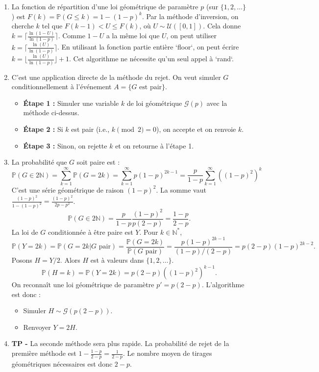 \documentclass[solutions]{exercices}
\begin{document}
\begin{solution}
\begin{enumerate}
  \item La fonction de répartition d'une loi géométrique de paramètre $p$ (sur $\{1, 2, \dots\}$) est $F(k) = \mathbb{P}(G \le k) = 1 - (1-p)^k$. Par la méthode d'inversion, on cherche $k$ tel que $F(k-1) < U \le F(k)$, où $U \sim \mathcal{U}([0,1])$. Cela donne $k = \lceil \frac{\ln(1-U)}{\ln(1-p)} \rceil$. Comme $1-U$ a la même loi que $U$, on peut utiliser $k = \lceil \frac{\ln(U)}{\ln(1-p)} \rceil$. En utilisant la fonction partie entière `floor`, on peut écrire $k = \lfloor \frac{\ln(U)}{\ln(1-p)} \rfloor + 1$. Cet algorithme ne nécessite qu'un seul appel à `rand`.
  \item C'est une application directe de la méthode du rejet. On veut simuler $G$ conditionnellement à l'événement $A = \{G \text{ est pair}\}$.
  \begin{itemize}
      \item \textbf{Étape 1 :} Simuler une variable $k$ de loi géométrique $\mathcal{G}(p)$ avec la méthode ci-dessus.
      \item \textbf{Étape 2 :} Si $k$ est pair (i.e., $k \pmod 2 = 0$), on accepte et on renvoie $k$.
      \item \textbf{Étape 3 :} Sinon, on rejette $k$ et on retourne à l'étape 1.
  \end{itemize}
  \item La probabilité que $G$ soit paire est :
  \[ \mathbb{P}(G \in 2\mathbb{N}) = \sum_{k=1}^{\infty} \mathbb{P}(G=2k) = \sum_{k=1}^{\infty} p(1-p)^{2k-1} = \frac{p}{1-p} \sum_{k=1}^{\infty} ((1-p)^2)^k \]
  C'est une série géométrique de raison $(1-p)^2$. La somme vaut $\frac{(1-p)^2}{1-(1-p)^2} = \frac{(1-p)^2}{2p-p^2}$.
  \[ \mathbb{P}(G \in 2\mathbb{N}) = \frac{p}{1-p} \frac{(1-p)^2}{p(2-p)} = \frac{1-p}{2-p}. \]
  La loi de $G$ conditionnée à être paire est $Y$. Pour $k \in \mathbb{N}^*$,
  \[ \mathbb{P}(Y=2k) = \mathbb{P}(G=2k | G \text{ pair}) = \frac{\mathbb{P}(G=2k)}{\mathbb{P}(G \text{ pair})} = \frac{p(1-p)^{2k-1}}{(1-p)/(2-p)} = p(2-p)(1-p)^{2k-2}. \]
  Posons $H = Y/2$. Alors $H$ est à valeurs dans $\{1,2,\dots\}$.
  \[ \mathbb{P}(H=k) = \mathbb{P}(Y=2k) = p(2-p) \left((1-p)^2\right)^{k-1}. \]
  On reconnaît une loi géométrique de paramètre $p' = p(2-p)$.
  L'algorithme est donc :
  \begin{itemize}
      \item Simuler $H \sim \mathcal{G}(p(2-p))$.
      \item Renvoyer $Y=2H$.
  \end{itemize}
  \item \textbf{TP -} La seconde méthode sera plus rapide. La probabilité de rejet de la première méthode est $1 - \frac{1-p}{2-p} = \frac{1}{2-p}$. Le nombre moyen de tirages géométriques nécessaires est donc $2-p$.
\end{enumerate}
\end{solution}
\end{document}
